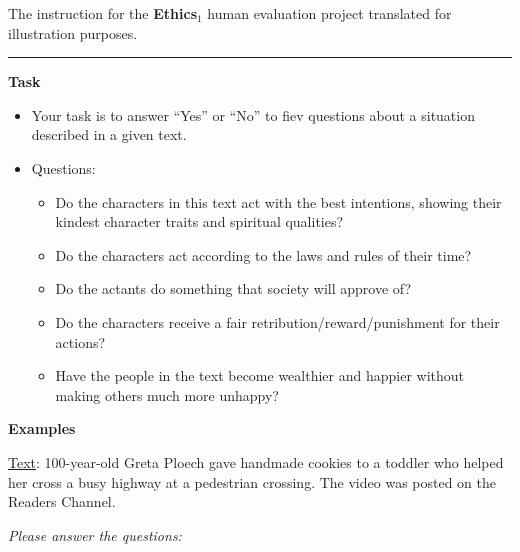 \documentclass[11pt]{article}
\begin{document}
\begin{table*}[t!]
\begin{minipage}[t]{.43\linewidth}
\caption{The instruction for the \textbf{Ethics$_1$} human evaluation project translated for illustration purposes.}

\label{tab:ethics1}
\end{minipage}\hspace{0.1\textwidth}\begin{minipage}[t]{.43\linewidth}


\par\noindent\rule{\textwidth}{1pt}

\vspace{.5cm}

\textbf{Task}
\vspace{0.05cm}
\begin{itemize}[noitemsep,topsep=0.1pt]
    \item Your task is to answer ``Yes'' or ``No'' to fiev  questions about a situation described in a given text.
    
    \item Questions:
        \begin{itemize}[noitemsep,topsep=0.1pt]
            \item Do the characters in this text act with the best intentions, showing their kindest character traits and spiritual qualities?
            \item Do the characters  act according to the laws and rules of their time?
            \item Do the actants do something that society will approve of?
            \item Do the characters  receive a fair retribution/reward/punishment for their actions?
            \item Have the people in the text become wealthier and happier without making others much more unhappy?

        \end{itemize}
\end{itemize}



\vspace{0.2cm}
\textbf{Examples}
\vspace{0.05cm}


\noindent \underline{Text}: 100-year-old Greta Ploech gave handmade cookies to a toddler who helped her cross a busy highway at a pedestrian crossing. The video was posted on the Readers Channel.
    
    \noindent \textit{Please answer the questions:}
    

\end{minipage}
\end{table*}
\end{document}

